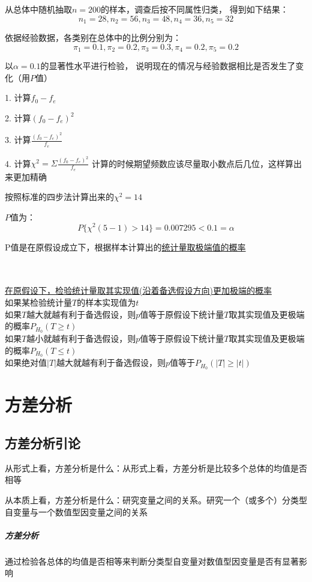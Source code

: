 \documentclass[UTF8,10pt]{book}
\begin{document}
{{从总体中随机抽取$n=200$的样本，调查后按不同属性归类，
得到如下结果： 
$$ n_1 = 28 , n_2 = 56 , n_3 = 48 , n_4 = 36 , n_5 = 32 $$ 

依据经验数据，各类别在总体中的比例分别为： 
$$ \pi_1 = 0.1 , \pi_2 = 0.2 , \pi_3 = 0.3 , \pi_4 = 0.2 , \pi_5 = 0.2 $$ 

以$\alpha=0.1$的显著性水平进行检验，
说明现在的情况与经验数据相比是否发生了变化（用$P$值）	

1. 计算$f_0 -f_e$ 

2. 计算$(f_0 -f_e)^2$ 

3. 计算$\frac{(f_0 -f_e)^2}{f_e}$ 

4. 计算$\chi^2 = \Sigma \frac{(f_0-f_e)^2}{f_e} $ 
计算的时候期望频数应该尽量取小数点后几位，这样算出来更加精确 

按照标准的四步法计算出来的$\chi^2 = 14$ 

$P$值为： 
$$ P\{\chi^2(5-1)>14\}=0.007295<0.1=\alpha $$	

P值是在原假设成立下，根据样本计算出的\underline{统计量取极端值的概率}
}
\\
\\

\underline{在原假设下，检验统计量取其实现值(沿着备选假设方向)更加极端的概率} \\
如果某检验统计量$T$的样本实现值为$t$ \\        			
如果$T$越大就越有利于备选假设，则$p$值等于原假设下统计量$T$取其实现值及更极端的概率$P_{H_0}(T\ge t)$ \\
如果$T$越小就越有利于备选假设，则$p$值等于原假设下统计量$T$取其实现值及更极端的概率$P_{H_0}(T\le t)$ \\
如果绝对值$|T|$越大就越有利于备选假设，则$p$值等于$P_{H_0}(|T|\ge |t|)$ \\


\clearpage
\chapter{方差分析}

\section{方差分析引论}
从形式上看，方差分析是什么：{\kaishu 从形式上看，方差分析是比较多个总体的均值是否相等}

从本质上看，方差分析是什么：{\kaishu 研究变量之间的关系。研究一个（或多个）分类型自变量与一个数值型因变量之间的关系}

\paragraph{方差分析}	通过检验各总体的均值是否相等来判断分类型自变量对数值型因变量是否有显著影响
}
\end{document}
